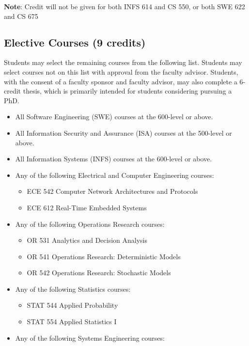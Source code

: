 \documentclass[oneside,11pt]{memoir}
\begin{document}
\textbf{Note}: Credit will not be given for both INFS 614 and CS 550, or both SWE 622 and CS 675


\subsection{Elective Courses (9 credits)}

Students may select the remaining courses from the following list. Students may select courses not on this list with approval from the faculty advisor. Students, with the consent of a faculty sponsor and faculty advisor, may also complete a 6-credit thesis, which is primarily intended for students considering pursuing a PhD.

\begin{itemize}
    \item All Software Engineering (SWE) courses at the 600-level or above.
    \item All Information Security and Assurance (ISA) courses at the 500-level or above.
    \item All Information Systems (INFS) courses at the 600-level or above.
    \item Any of the following Electrical and Computer Engineering courses:
    \begin{itemize}
        \item ECE 542 Computer Network Architectures and Protocols
        \item ECE 612 Real-Time Embedded Systems
\end{itemize}        
    \item Any of the following Operations Research courses:
    \begin{itemize}
        \item OR 531 Analytics and Decision Analysis
        \item OR 541 Operations Research: Deterministic Models
        \item OR 542 Operations Research: Stochastic Models
\end{itemize}        
    \item Any of the following Statistics courses:
    \begin{itemize}
        \item STAT 544 Applied Probability
        \item STAT 554 Applied Statistics I
\end{itemize}        
    \item Any of the following Systems Engineering courses:

\end{itemize}
\end{document}
